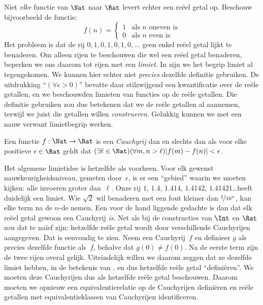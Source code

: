 \documentclass[openany]{memoir}
\begin{document}
Niet \emph{elke} functie van $\Nat$ naar $\Rat$ levert echter een reëel
getal op. Beschouw bijvoorbeeld de functie:
\[
	f(n) =\begin{cases}
			1 & \text{als }n\text{ oneven is}\\
			0 &\text{als }n\text{ even is}
		\end{cases}
\]
Het probleem is dat de rij $0,1,0,1,0,1,0,\ldots$ geen enkel reëel
getal lijkt te benaderen. Om alleen rijen te beschouwen die wel een
reëel getal benaderen, beperken we ons daarom tot rijen met een
\emph{limiet}.
In  zijn we het begrip limiet al
tegengekomen. We kunnen hier echter niet \emph{precies} dezelfde
definitie gebruiken. De uitdrukking ``$(\forall \epsilon>0)$'' bevatte
daar stilzwijgend een kwantificatie over de reële getallen, en we
beschouwden limieten van functies op de reële getallen. Die definitie
gebruiken zou dus betekenen dat we de reële getallen al aannemen,
terwijl we juist die getallen willen \emph{construeren}. Gelukkig
kunnen we met een nauw verwant limietbegrip werken.
\begin{defn}
  Een functie $f: \Nat \to \Rat$ is een \emph{Cauchyrij} dan en slechts
  dan als voor elke positieve $\epsilon \in \Rat$ geldt dat $(\exists
  \ell \in \Nat)(\forall m, n > \ell)|f(m) - f(n)| < \epsilon$.
\end{defn}
Het algemene limietidee is hetzelfde als voorheen. Voor elk gewenst
nauwkeurigheidsniveau, gemeten door~$\epsilon$, is er een ``gebied''
waarin we moeten kijken: alle invoeren groter dan~$\ell$. Onze rij
$1$, $1.4$, $1.414$, $1.4142$, $1.41421$\ldots heeft duidelijk een
limiet. Wie $\sqrt{2}$ wil benaderen met een fout kleiner dan
$\nicefrac{1}{10^{n}}$, kan elke term na de $n$-de nemen.
Een voor de hand liggende gedachte is dan dat elk reëel getal gewoon
een Cauchyrij \emph{is}. Net als bij de constructies van $\Int$ en
$\Rat$ zou dat te na\"ief zijn: hetzelfde reële getal wordt door
verschillende Cauchyrijen aangegeven. Dat is eenvoudig te zien. Neem
een Cauchyrij~$f$ en definieer $g$ als precies dezelfde functie als~$f$,
behalve dat $g(0)\neq f(0)$. Na de eerste term zijn de twee rijen
overal gelijk. Uiteindelijk willen we daarom zeggen dat ze dezelfde
limiet hebben, in de betekenis van , en dus
hetzelfde reële getal ``definiëren''. We moeten deze Cauchyrijen dus als
hetzelfde reële getal beschouwen.
Daarom moeten we opnieuw een equivalentierelatie op de Cauchyrijen
definiëren en reële getallen met equivalentieklassen van Cauchyrijen identificeren.
\end{document}
